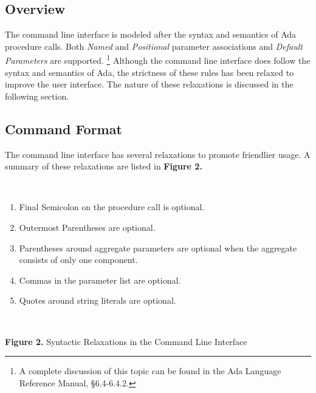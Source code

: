 \subsection{Overview}
The \ayacc command line interface is modeled after the syntax and
semantics of Ada procedure
calls.  Both {\it Named} and {\it Positional} parameter associations and
{\it Default Parameters} are supported.
\footnote{
A complete discussion of this topic can be found in the Ada Language
Reference Manual, \S 6.4-6.4.2.
}
Although the command line 
interface does follow the syntax and semantics of Ada, the
strictness of these rules has been relaxed to improve the user
interface.  The nature of these relaxations is discussed in the
following section.
\subsection{Command Format}
The command line interface has several relaxations to promote friendlier
usage.  A summary of these relaxations are listed in {\bf Figure 2.}

\noindent\hspace{-0.05in}\hrulefill\hspace{0.0in}\\
\vspace{-0.2in}
\begin{enumerate}
\item Final Semicolon on the procedure call is optional.
\item Outermost Parentheses are optional.
\item Parentheses around aggregate parameters are optional when the aggregate
consists of only one component.
\item Commas in the parameter list are optional.
\item Quotes around string literals are optional.
\end{enumerate}
\hspace{-0.05in}\hrulefill\hspace{0.0in}\\
\centerline{{\bf Figure 2.} Syntactic Relaxations in the Command Line Interface}
